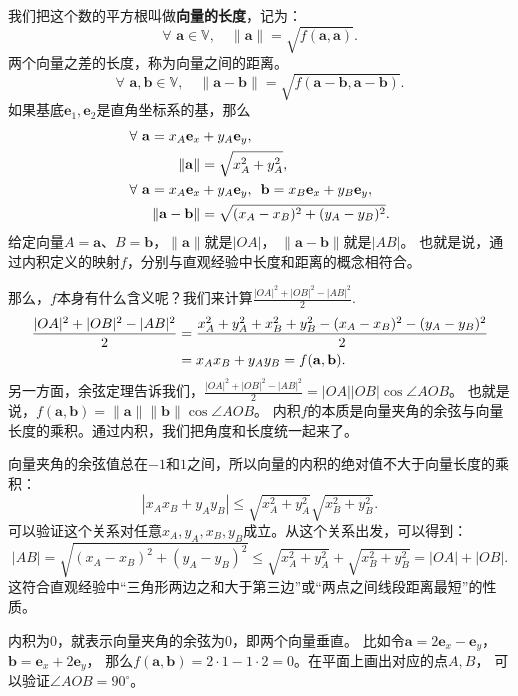 \documentclass[12pt,UTF8]{ctexbook}
\begin{document}
我们把这个数的平方根叫做\textbf{向量的长度}，记为：
$$ \forall \,\, \mathbf{a} \in \mathbb{V}, \quad \| \mathbf{a}\| = \sqrt{f(\mathbf{a}, \mathbf{a})}. $$
两个向量之差的长度，称为向量之间的距离。
$$ \forall \,\, \mathbf{a}, \mathbf{b} \in \mathbb{V}, \quad \| \mathbf{a} - \mathbf{b}\| = \sqrt{f(\mathbf{a} - \mathbf{b}, \mathbf{a} - \mathbf{b})}. $$
如果基底$\mathbf{e}_1, \mathbf{e}_2$是直角坐标系的基，那么
\begin{align}
    \forall \,\, \mathbf{a} = x_A\mathbf{e}_x &+ y_A\mathbf{e}_y , \notag \\
    \| \mathbf{a}\| &= \sqrt{x_A^2 + y_A^2}, \notag \\
    \forall \,\, \mathbf{a} = x_A\mathbf{e}_x &+ y_A\mathbf{e}_y,\,\,\, \mathbf{b} = x_B\mathbf{e}_x + y_B\mathbf{e}_y , \notag \\
    \| \mathbf{a} - \mathbf{b}\| &= \sqrt{(x_A - x_B)^2 + (y_A - y_B)^2}. \notag
\end{align}
给定向量$A = \mathbf{a}$、$B =\mathbf{b}$，$\| \mathbf{a} \|$就是$|OA|$，
$\|\mathbf{a} - \mathbf{b}\|$就是$|AB|$。
也就是说，通过内积定义的映射$f$，分别与直观经验中长度和距离的概念相符合。

那么，$f$本身有什么含义呢？我们来计算$ \frac{|OA|^2 + |OB|^2 - |AB|^2}{2}.$
\begin{align}
    \frac{|OA|^2 + |OB|^2 - |AB|^2}{2} &= \frac{x_A^2 + y_A^2 + x_B^2 + y_B^2 - (x_A - x_B)^2 - (y_A - y_B)^2}{2} \notag \\
    &= x_Ax_B + y_Ay_B = f(\mathbf{a}, \mathbf{b}). \notag 
\end{align}
另一方面，余弦定理告诉我们，$ \frac{|OA|^2 + |OB|^2 - |AB|^2}{2} = |OA||OB|\cos \angle AOB$。
也就是说，$f(\mathbf{a}, \mathbf{b}) = \|\mathbf{a}\| \|\mathbf{b}\| \cos \angle AOB$。%
内积$f$的本质是向量夹角的余弦与向量长度的乘积。通过内积，我们把角度和长度统一起来了。

向量夹角的余弦值总在$-1$和$1$之间，所以向量的内积的绝对值不大于向量长度的乘积：
$$ |x_Ax_B + y_Ay_B| \leqslant \sqrt{x_A^2 + y_A^2} \sqrt{x_B^2 + y_B^2}.$$
可以验证这个关系对任意$x_A, y_A, x_B, y_B$成立。从这个关系出发，可以得到：
$$ |AB| = \sqrt{(x_A - x_B)^2 + (y_A - y_B)^2} \leqslant \sqrt{x_A^2 + y_A^2} + \sqrt{x_B^2 + y_B^2} = |OA| + |OB|.$$
这符合直观经验中“三角形两边之和大于第三边”或“两点之间线段距离最短”的性质。

内积为$0$，就表示向量夹角的余弦为$0$，即两个向量垂直。
比如令$\mathbf{a} = 2\mathbf{e}_x - \mathbf{e}_y$，$\mathbf{b} = \mathbf{e}_x + 2\mathbf{e}_y$，
那么$f(\mathbf{a}, \mathbf{b}) = 2\cdot 1 - 1\cdot 2 = 0$。在平面上画出对应的点$A,B$，
可以验证$\angle AOB = 90^\circ$。
\end{document}
